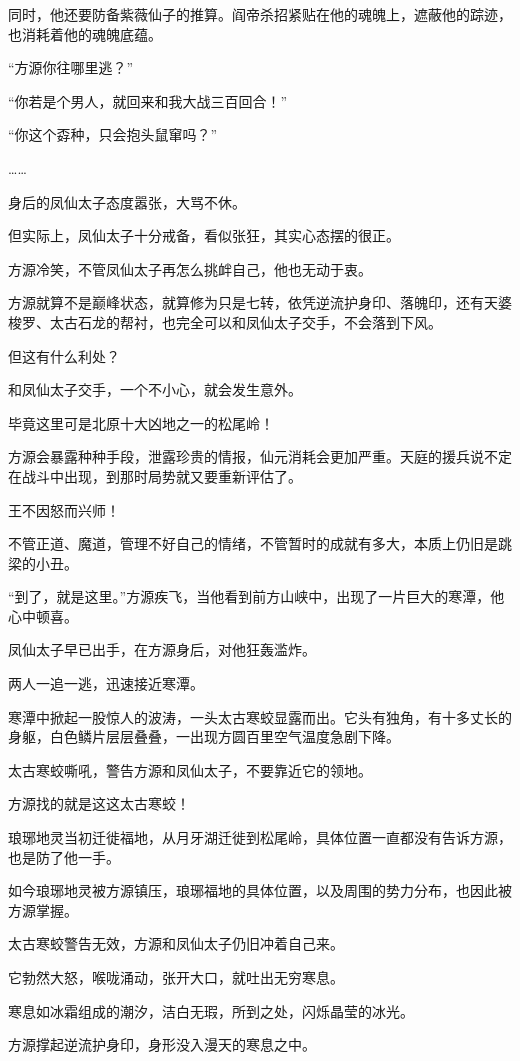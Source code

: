 \begin{this_body}
同时，他还要防备紫薇仙子的推算。阎帝杀招紧贴在他的魂魄上，遮蔽他的踪迹，也消耗着他的魂魄底蕴。

“方源你往哪里逃？”

“你若是个男人，就回来和我大战三百回合！”

“你这个孬种，只会抱头鼠窜吗？”

……

身后的凤仙太子态度嚣张，大骂不休。

但实际上，凤仙太子十分戒备，看似张狂，其实心态摆的很正。

方源冷笑，不管凤仙太子再怎么挑衅自己，他也无动于衷。

方源就算不是巅峰状态，就算修为只是七转，依凭逆流护身印、落魄印，还有天婆梭罗、太古石龙的帮衬，也完全可以和凤仙太子交手，不会落到下风。

但这有什么利处？

和凤仙太子交手，一个不小心，就会发生意外。

毕竟这里可是北原十大凶地之一的松尾岭！

方源会暴露种种手段，泄露珍贵的情报，仙元消耗会更加严重。天庭的援兵说不定在战斗中出现，到那时局势就又要重新评估了。

王不因怒而兴师！

不管正道、魔道，管理不好自己的情绪，不管暂时的成就有多大，本质上仍旧是跳梁的小丑。

“到了，就是这里。”方源疾飞，当他看到前方山峡中，出现了一片巨大的寒潭，他心中顿喜。

凤仙太子早已出手，在方源身后，对他狂轰滥炸。

两人一追一逃，迅速接近寒潭。

寒潭中掀起一股惊人的波涛，一头太古寒蛟显露而出。它头有独角，有十多丈长的身躯，白色鳞片层层叠叠，一出现方圆百里空气温度急剧下降。

太古寒蛟嘶吼，警告方源和凤仙太子，不要靠近它的领地。

方源找的就是这这太古寒蛟！

琅琊地灵当初迁徙福地，从月牙湖迁徙到松尾岭，具体位置一直都没有告诉方源，也是防了他一手。

如今琅琊地灵被方源镇压，琅琊福地的具体位置，以及周围的势力分布，也因此被方源掌握。

太古寒蛟警告无效，方源和凤仙太子仍旧冲着自己来。

它勃然大怒，喉咙涌动，张开大口，就吐出无穷寒息。

寒息如冰霜组成的潮汐，洁白无瑕，所到之处，闪烁晶莹的冰光。

方源撑起逆流护身印，身形没入漫天的寒息之中。


\end{this_body}
